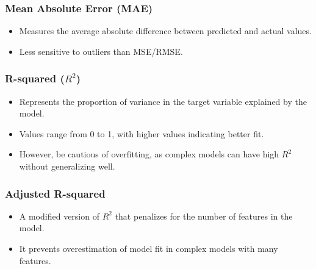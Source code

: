         \subsubsection{Mean Absolute Error (MAE)}
            \begin{itemize}
                \item Measures the average absolute difference between predicted and actual values.
                \item Less sensitive to outliers than MSE/RMSE.
            \end{itemize}
        \subsubsection{R-squared ($R^2$)}
            \begin{itemize}
                \item Represents the proportion of variance in the target variable explained by the model.
                \item Values range from 0 to 1, with higher values indicating better fit.
                \item However, be cautious of overfitting, as complex models can have high $R^2$ without generalizing well.
            \end{itemize}
        \subsubsection{Adjusted R-squared}
            \begin{itemize}
                \item A modified version of $R^2$ that penalizes for the number of features in the model.
                \item It prevents overestimation of model fit in complex models with many features.
            \end{itemize}